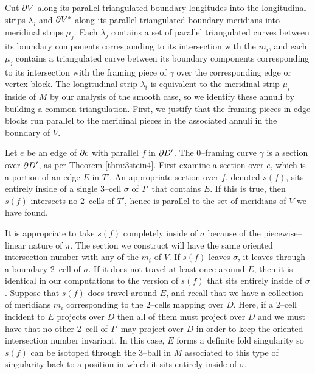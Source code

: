 Cut $\partial V$ along its parallel triangulated boundary longitudes into the longitudinal strips $\lambda_j$ and $\partial V^*$ along its parallel triangulated boundary meridians into meridinal strips $\mu_j$.
Each $\lambda_j$ contains a set of parallel triangulated curves between its boundary components corresponding to its intersection with the $m_i$, and each $\mu_j$ contains a triangulated curve between its boundary components corresponding to its intersection with the framing piece of $\gamma$ over the corresponding edge or vertex block.
The longitudinal strip $\lambda_i$ is equivalent to the meridinal strip $\mu_i$ inside of $M$ by our analysis of the smooth case, so we identify these annuli by building a common triangulation.
First, we justify that the framing pieces in edge blocks run parallel to the meridinal  pieces in the associated annuli in the boundary of $V$.

Let $e$ be an edge of $\partial c$ with parallel $f$ in $\partial D'$.
The 0--framing curve $\gamma$ is a section over $\partial D'$, as per Theorem \ref{thm:3stein4}.
First examine a section over $e$, which is a portion of an edge $E$ in $T'$.
An appropriate section over $f$, denoted $s(f)$, sits entirely inside of a single 3--cell $\sigma$ of $T'$ that contains $E$.
If this is true, then $s(f)$ intersects no 2--cells of $T'$, hence is parallel to the set of meridians of $V$ we have found.

It is appropriate to take $s(f)$ completely inside of $\sigma$ because of the piecewise--linear nature of $\pi$.
The section we construct will have the same oriented intersection number with any of the $m_i$ of $V$.
If $s(f)$ leaves $\sigma$, it leaves through a boundary 2--cell of $\sigma$.
If it does not travel at least once around $E$, then it is identical in our computations to the version of $s(f)$ that sits entirely inside of $\sigma$.
Suppose that $s(f)$ does travel around $E$, and recall that we have a collection of meridians $m_i$ corresponding to the 2--cells mapping over $D$.
Here, if a 2--cell incident to $E$ projects over $D$ then all of them must project over $D$ and we must have that no other 2--cell of $T'$ may project over $D$ in order to keep the oriented intersection number invariant.
In this case, $E$ forms a definite fold singularity so $s(f)$ can be isotoped through the 3--ball in $M$ associated to this type of singularity back to a position in which it sits entirely inside of $\sigma$.

